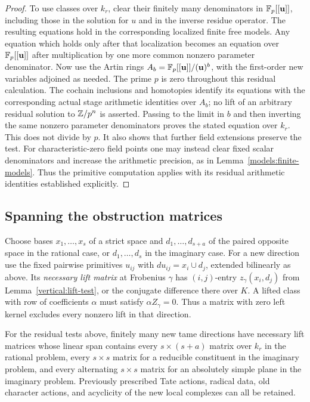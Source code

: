 \begin{proof}
To use classes over $k_r$, clear their finitely many denominators
in $\mathbb F_p[[\mathbf u]]$, including those in the solution for $u$
and in the inverse residue operator.  The resulting equations
hold in the corresponding localized finite free models.  Any
equation which holds only after that localization becomes an
equation over $\mathbb F_p[[\mathbf u]]$ after multiplication by one
more common nonzero parameter denominator.  Now use the Artin
rings $A_b=\mathbb F_p[[\mathbf u]]/(\mathbf u)^b$, with the first-order
new variables adjoined as needed.  The prime $p$ is zero
throughout this residual calculation.  The cochain inclusions
and homotopies identify its equations with the corresponding
actual stage arithmetic identities over $A_b$; no lift of an
arbitrary residual solution to $\mathbb Z/p^n$ is asserted.  Passing
to the limit in $b$ and then inverting the same
nonzero parameter denominators proves the stated equation over
$k_r$.  This does not divide by $p$.  It also shows that further
field extensions preserve the test.  For characteristic-zero
field points one may instead clear fixed scalar denominators
and increase the arithmetic precision, as in
Lemma~\ref{models:finite-models}.  Thus the primitive computation applies
with its residual arithmetic identities established explicitly.
\end{proof}

\subsection{Spanning the obstruction matrices}

Choose bases $x_1,\ldots,x_s$ of a strict space and
$d_1,\ldots,d_{s+a}$ of the paired opposite space in the rational
case, or $d_1,\ldots,d_s$ in the imaginary case.  For a new
direction use the fixed pairwise primitives $u_{ij}$ with
$du_{ij}=x_i\cup d_j$, extended bilinearly as above.  Its
\emph{necessary lift matrix} at Frobenius $\gamma$
has $(i,j)$-entry $z_\gamma(x_i,d_j)$ from
Lemma~\ref{vertical:lift-test}, or the conjugate difference there
over $K$.  A lifted class with row of coefficients $\alpha$ must
satisfy $\alpha Z_\gamma=0$.  Thus a matrix with zero left kernel
excludes every nonzero lift in that direction.

\begin{lemma}\label{vertical:obstruction-span}
For the residual tests above, finitely many new tame directions
have necessary lift matrices whose linear span contains every
$s\times(s+a)$ matrix over $k_r$ in the rational problem, every
$s\times s$ matrix for a reducible constituent in the imaginary
problem, and every alternating $s\times s$ matrix for an
absolutely simple plane in the imaginary problem.  Previously
prescribed Tate actions, radical data, old character actions,
and acyclicity of the new local complexes can all be retained.
\end{lemma}

